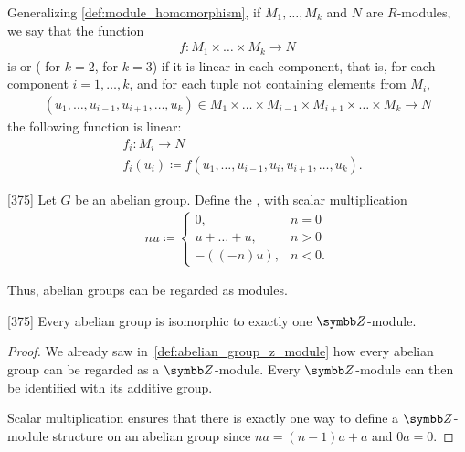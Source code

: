 \begin{definition}\label{def:multilinear_function}
  Generalizing \cref{def:module_homomorphism}, if \( M_1, \ldots, M_k \) and \( N \) are \( R \)-modules, we say that the function
  \begin{align*}
    f: M_1 \times \ldots \times M_k \to N
  \end{align*}
  is  or  ( for \( k = 2 \),  for \( k = 3 \)) if it is linear in each component, that is, for each component \( i = 1, \ldots, k \), and for each tuple not containing elements from \( M_i \),
  \begin{align*}
    (u_1, \ldots, u_{i-1}, u_{i+1}, \ldots, u_k) \in M_1 \times \ldots \times M_{i-1} \times M_{i+1} \times \ldots \times M_k \to N
  \end{align*}
  the following function is linear:
  \begin{align*}
    &f_i: M_i \to N \\
    &f_i(u_i) \coloneqq f(u_1, \ldots, u_{i-1}, u_i, u_{i+1}, \ldots, u_k).
  \end{align*}
\end{definition}

\begin{definition}\label{def:abelian_group_z_module}\cite{Knapp2016BAlg}[375]
  Let \( G \) be an abelian group. Define the , with scalar multiplication
  \begin{align*}
    nu \coloneqq \begin{cases}
      0, &n = 0 \\
      u + \ldots + u, &n > 0 \\
      -((-n)u), &n < 0.
    \end{cases}
  \end{align*}

  Thus, abelian groups can be regarded as modules.
\end{definition}

\begin{proposition}\label{thm:abelian_group_iff_z_module}\cite{Knapp2016BAlg}[375]
  Every abelian group is isomorphic to exactly one \( \BB{Z} \)-module.
\end{proposition}
\begin{proof}
  We already saw in~\cref{def:abelian_group_z_module} how every abelian group can be regarded as a \( \BB{Z} \)-module. Every \( \BB{Z} \)-module can then be identified with its additive group.

  Scalar multiplication ensures that there is exactly one way to define a \( \BB{Z} \)-module structure on an abelian group since \( na = (n-1)a + a \) and \( 0a = 0 \).
\end{proof}


